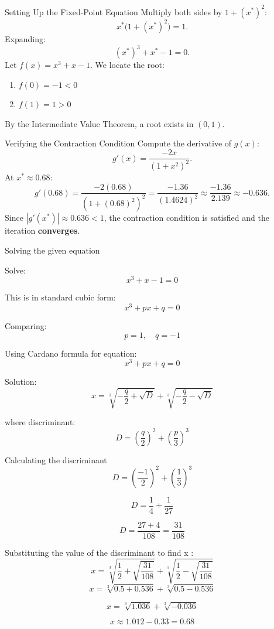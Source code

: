 \documentclass{beamer}
\providecommand{\abs}[1]{\left\vert#1\right\vert}
\begin{document}
\begin{frame}{Setting Up the Fixed-Point Equation}
Multiply both sides by $1+(x^*)^2$:
\[
  x^*\bigl(1+(x^*)^2\bigr) = 1.
\]
Expanding:
\[
  (x^*)^3 + x^* - 1 = 0.
\]
Let $f(x) = x^3 + x - 1$. We locate the root:
\begin{enumerate}
\item $f(0) = -1 < 0$
\item $f(1) = 1 > 0$
\end{enumerate}
By the Intermediate Value Theorem, a root exists in $(0,1)$.
\end{frame}
\begin{frame}{Verifying the Contraction Condition}
Compute the derivative of $g(x)$:
\[
  g'(x) = \frac{-2x}{(1+x^2)^2}.
\]
At $x^* \approx 0.68$:
\[
  g'(0.68) = \frac{-2(0.68)}{(1+(0.68)^2)^2}
           = \frac{-1.36}{(1.4624)^2}
           \approx \frac{-1.36}{2.139}
           \approx -0.636.
\]
Since $\abs{g'(x^*)} \approx 0.636 < 1$, the contraction condition is satisfied and the iteration \textbf{converges}.
\end{frame}

\begin{frame}{Solving the given equation}

Solve:
\[
x^3 + x - 1 = 0
\]

This is in standard cubic form:
\[
x^3 + px + q = 0
\]

Comparing:
\[
p = 1, \quad q = -1
\]

Using Cardano formula for equation:
\[
x^3 + px + q = 0
\]

Solution:
\[
x = \sqrt[3]{-\frac{q}{2} + \sqrt{D}} + \sqrt[3]{-\frac{q}{2} - \sqrt{D}}
\]

where discriminant:
\[
D = \left(\frac{q}{2}\right)^2 + \left(\frac{p}{3}\right)^3
\]

\end{frame}


\begin{frame}

Calculating the discriminant
\[
D = \left(\frac{-1}{2}\right)^2 + \left(\frac{1}{3}\right)^3
\]

\[
D = \frac{1}{4} + \frac{1}{27}
\]

\[
D = \frac{27 + 4}{108} = \frac{31}{108}
\]

Substituting the value of the discriminant to find x : 
\[
x = \sqrt[3]{\frac{1}{2} + \sqrt{\frac{31}{108}}}
+
\sqrt[3]{\frac{1}{2} - \sqrt{\frac{31}{108}}}
\]
\[
x = \sqrt[3]{0.5 + 0.536} + \sqrt[3]{0.5 - 0.536}
\]

\[
x = \sqrt[3]{1.036} + \sqrt[3]{-0.036}
\]

\[
x \approx 1.012 - 0.33 = 0.68
\]

\end{frame}
\end{document}
